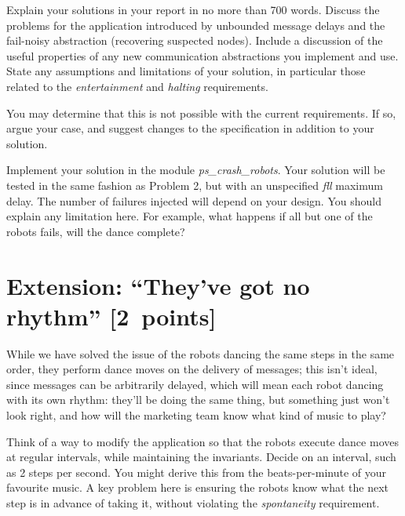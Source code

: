 \documentclass[a4paper]{article}
\begin{document}
Explain your solutions in your report in no more than 700 words.
Discuss the problems for the application introduced by unbounded message
delays and the fail-noisy abstraction (recovering suspected nodes).
Include a discussion of the useful properties of any new
communication abstractions you implement and use.
State any assumptions and limitations of your solution, in particular those
related to the \emph{entertainment} and \emph{halting} requirements.

You may determine that this is not possible with the
current requirements. If so, argue your case, and suggest changes to the
specification in addition to your solution.

Implement your solution in the module \emph{ps\_crash\_robots}.
Your solution will be tested in the same fashion as Problem 2, but with
an unspecified \emph{fll} maximum delay. The number of failures injected will
depend on your design. You should explain any limitation here. For example,
what happens if all but one of the robots fails, will the dance complete?












\section*{Extension: ``They've got no rhythm'' [2~points]} %
\label{sec:buffered_dance_routine}

While we have solved the issue of the robots dancing the same steps in the
same order, they perform dance moves on the delivery of messages; this isn't
ideal, since messages can be arbitrarily delayed, which will mean each robot
dancing with its own rhythm: they'll be doing the same thing, but something
just won't look right, and how will the marketing team know what kind of music
to play?

Think of a way to modify the application so that the robots execute dance
moves at regular intervals, while maintaining the invariants. Decide on an
interval, such as 2 steps per second. You might derive this from the
beats-per-minute of your favourite music. A key problem here is ensuring the
robots know what the next step is in advance of taking it, without violating
the \emph{spontaneity} requirement.
\end{document}
